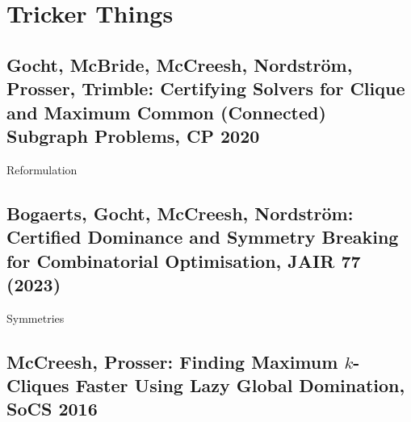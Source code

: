 \documentclass[aspectratio=169,compress,10pt]{beamer}
\begin{document}
\section{Tricker Things}

\subsection{Gocht, McBride, McCreesh, Nordstr\"om, Prosser, Trimble: Certifying Solvers for Clique and Maximum Common (Connected) Subgraph Problems, CP 2020}

\begin{frame}{Reformulation}
\end{frame}

\subsection{Bogaerts, Gocht, McCreesh, Nordstr\"om: Certified Dominance and Symmetry Breaking for
Combinatorial Optimisation, JAIR 77 (2023)}

\begin{frame}{Symmetries}
\end{frame}

\subsection{McCreesh, Prosser: Finding Maximum $k$-Cliques Faster Using Lazy Global Domination, SoCS 2016}
\end{document}
